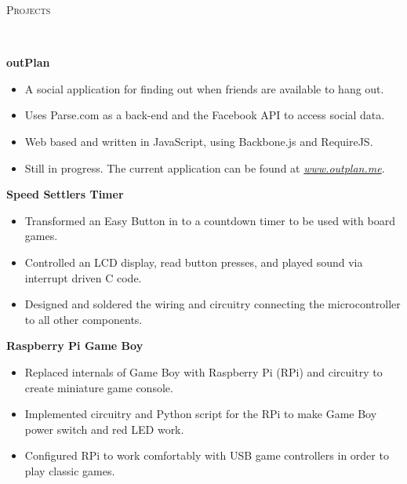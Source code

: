 \documentclass{article}
\newenvironment{changemargin}[2]{%
  \begin{list}{}{%
    \setlength{\topsep}{0pt}%
    \setlength{\leftmargin}{#1}%
    \setlength{\rightmargin}{#2}%
    \setlength{\listparindent}{\parindent}%
    \setlength{\itemindent}{\parindent}%
    \setlength{\parsep}{\parskip}%
  }%
  \item[]}{\end{list}
}
\newcommand{\lineover}{
	\begin{changemargin}{-0.05in}{-0.05in}
		\vspace*{-8pt}
		\hrulefill \\
		\vspace*{-2pt}
	\end{changemargin}
}
\newcommand{\header}[1]{
	\begin{changemargin}{-0.5in}{-0.5in}
		\scshape{#1}\\
  	\lineover
	\end{changemargin}
}
\newenvironment{body} {
	\vspace*{-16pt}
	\begin{changemargin}{-0.25in}{-0.5in}
  }	
	{\end{changemargin}
}
\begin{document}
\header{Projects}
\begin{body}
	\vspace{14pt}
	
	\textbf{outPlan}\\
	\begin{itemize} \itemsep -0pt  %
		\item A social application for finding out when friends are available to hang out.
		\item Uses Parse.com as a back-end and the Facebook API to access social data.		
		\item Web based and written in JavaScript, using Backbone.js and RequireJS.
		\item Still in progress. The current application can be found at \emph{\href{http://www.outplan.me}{www.outplan.me}}.
	\end{itemize}		

	\textbf{Speed Settlers Timer}\\
	\begin{itemize} \itemsep -0pt  %
		\item Transformed an Easy Button in to a countdown timer to be used with board games.
		\item Controlled an LCD display, read button presses, and played sound via interrupt driven C code.
		\item Designed and soldered the wiring and circuitry connecting the microcontroller to all other components.
	\end{itemize}
	
	\textbf{Raspberry Pi Game Boy}\\
	\begin{itemize} \itemsep -0pt  %
		\item Replaced internals of Game Boy with Raspberry Pi (RPi) and circuitry to create miniature game console.
		\item Implemented circuitry and Python script for the RPi to make Game Boy power switch and red LED work.		
		\item Configured RPi to work comfortably with USB game controllers in order to play classic games.
	\end{itemize}
		
\end{body}
\end{document}
